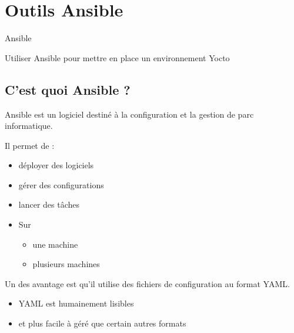 \documentclass[compress]{smilebeamer}
\begin{document}
\section{Outils Ansible}

\begin{frame}{Ansible}
\end{frame}

\begin{frame}
\begin{center}
\textcolor{smileOrange}{\huge{Utiliser Ansible pour mettre en place un environnement Yocto}}
\end{center}
\end{frame}

\subsection{C'est quoi Ansible ?}

\begin{frame}
\begin{definition}
Ansible est un logiciel destiné à la configuration et la gestion de parc informatique.
\end{definition}
Il permet de :
\begin{itemize}
	\item déployer des logiciels
	\item gérer des configurations
	\item lancer des tâches
\end{itemize}
\begin{itemize}
	\item[] Sur
	\begin{itemize}
	\item une machine
	\item plusieurs machines
	\end{itemize}
\end{itemize}
\end{frame}

\begin{frame}
	Un des avantage est qu'il utilise des fichiers de configuration au format YAML.
\begin{itemize}
	\item YAML est humainement lisibles
	\item et plus facile à géré que certain autres formats
\end{itemize}
\end{frame}
\end{document}

